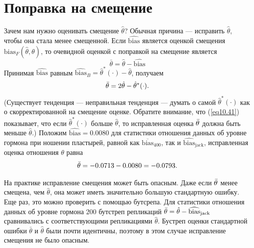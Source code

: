 \section{Поправка на смещение}

Зачем нам нужно оценивать смещение $\hat{\theta}$? Обычная причина --- исправить $\hat{\theta}$, чтобы она стала менее смещенной. Если $\widehat{\text{bias}}$ является оценкой смещения $\text{bias}_{F}(\hat{\theta}, \theta)$, то очевидной оценкой с поправкой на смещение является
\begin{equation}\label{eq10.40}
    \bar{\theta} = \hat{\theta} - \widehat{\text{bias}}
\end{equation}
Принимая $\widehat{\text{bias}}$ равным $\widehat{\text{bias}}_{B} = \hat{\theta}^{*}(\cdot) - \hat{\theta}$, получаем
\begin{equation}\label{eq10.41}
    \Bar{\theta} = 2\hat{\theta} - \hat{\theta}^{*}(\cdot).
\end{equation}
(Существует тенденция --- неправильная тенденция --- думать о самой $\hat{\theta}^{*}(\cdot)$ как о скорректированной на смещение оценке. Обратите внимание, что (\ref{eq10.41}) показывает, что если $\hat{\theta}^{*}(\cdot)$ больше $\hat{\theta}$, то исправленная оценка $\Bar{\theta}$ должна быть меньше $\hat{\theta}$.) Положим $\widehat{\text{bias}} = 0.0080$ для статистики отношения данных об уровне гормона при ношении пластырей, равной как $\overline{\text{bias}}_{400}$, так и $\widehat{\text{bias}}_{\text{jack}}$, исправленная оценка отношения $\theta$ равна
\begin{equation}\label{eq10.42}
    \Bar{\theta} = -0.0713 - 0.0080 = -0.0793. 
\end{equation}

На практике исправление смещения может быть опасным. Даже если $\Bar{\theta}$ менее смещена, чем $\hat{\theta}$, она может иметь значительно большую стандартную ошибку. Еще раз, это можно проверить с помощью бутсрепа. Для статистики отношения данных об уровне гормона $200$ бутстреп репликаций $\Bar{\theta} = \hat{\theta} - \widehat{\text{bias}}_{\text{jack}}$ сравнивались с соответствующими репликациями $\hat{\theta}$. Бустреп оценки стандартной ошибки $\bar{\theta}$ и $\hat{\theta}$ были почти идентичны, поэтому в этом случае исправление смещения не было опасным.

